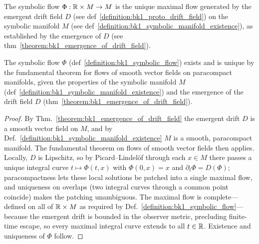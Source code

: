 \begin{definition}
\label{definition:bk1_symbolic_flow}
The symbolic flow $\Phi: \mathbb{R} \times M \to M$ is the unique maximal flow generated by the emergent drift field $D$ (see def~\ref{definition:bk1_proto_drift_field}) on the symbolic manifold $M$ (see def~\ref{definition:bk1_symbolic_manifold_existence}), as established by the emergence of $D$ (see thm~\ref{theorem:bk1_emergence_of_drift_field}).
\end{definition}

\begin{lemma}
\label{lemma:bk1_existence_and_uniqueness_of_flow}
The symbolic flow $\Phi$ (def~\ref{definition:bk1_symbolic_flow}) exists and is unique by the fundamental theorem for flows of smooth vector fields on paracompact manifolds, given the properties of the symbolic manifold $M$ (def~\ref{definition:bk1_symbolic_manifold_existence}) and the emergence of the drift field $D$ (thm~\ref{theorem:bk1_emergence_of_drift_field}).
\end{lemma}
\begin{proof}
\label{proof:bk1_existence_and_uniqueness_of_flow}
\leavevmode
By Thm.~\ref{theorem:bk1_emergence_of_drift_field} the emergent drift $D$ is a smooth vector field on $M$, and by Def.~\ref{definition:bk1_symbolic_manifold_existence} $M$ is a smooth, paracompact manifold. The fundamental theorem on flows of smooth vector fields then applies. Locally, $D$ is Lipschitz, so by Picard--Lindel\"of through each $x \in M$ there passes a unique integral curve $t \mapsto \Phi(t,x)$ with $\Phi(0,x)=x$ and $\partial_t \Phi = D(\Phi)$; paracompactness lets these local solutions be patched into a single maximal flow, and uniqueness on overlaps (two integral curves through a common point coincide) makes the patching unambiguous. The maximal flow is complete---defined on all of $\mathbb{R} \times M$ as required by Def.~\ref{definition:bk1_symbolic_flow}---because the emergent drift is bounded in the observer metric, precluding finite-time escape, so every maximal integral curve extends to all $t \in \mathbb{R}$. Existence and uniqueness of $\Phi$ follow.
\end{proof}
